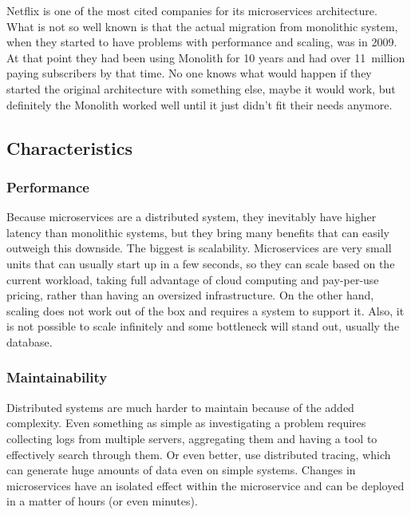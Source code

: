 \begin{note*}
    Netflix is one of the most cited companies for its microservices architecture. What is not so well known is that the actual migration from monolithic system, when they started to have problems with performance and scaling, was in 2009. At that point they had been using Monolith for 10 years and had over 11~million \cite{NETFLIX_2009_EARNINGS} paying subscribers by that time. No one knows what would happen if they started the original architecture with something else, maybe it would work, but definitely the Monolith worked well until it just didn't fit their needs anymore.
\end{note*}



\subsection{Characteristics}
\subsubsection{Performance}
\label{section:microservices:performance}
Because microservices are a distributed system, they inevitably have higher latency than monolithic systems, but they bring many benefits that can easily outweigh this downside. The biggest is scalability. Microservices are very small units that can usually start up in a few seconds, so they can scale based on the current workload, taking full advantage of cloud computing and pay-per-use pricing, rather than having an oversized infrastructure. On the other hand, scaling does not work out of the box and requires a system to support it. Also, it is not possible to scale infinitely and some bottleneck will stand out, usually the database.


\subsubsection{Maintainability}
Distributed systems are much harder to maintain because of the added complexity. Even something as simple as investigating a problem requires collecting logs from multiple servers, aggregating them and having a tool to effectively search through them. Or even better, use distributed tracing, which can generate huge amounts of data even on simple systems. Changes in microservices have an isolated effect within the microservice and can be deployed in a matter of hours (or even minutes).


